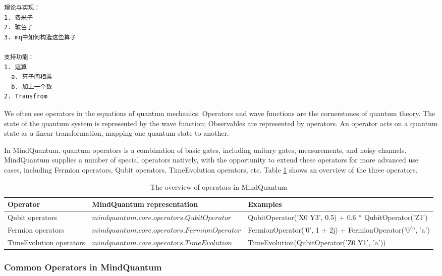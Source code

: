 \begin{lstlisting}
理论与实现：
1. 费米子
2. 玻色子
3. mq中如何构造这些算子

支持功能：
1. 运算
  a. 算子间相乘
  b. 加上一个数
2. Transfrom
\end{lstlisting}

We often see operators in the equations of quantum mechanics. Operators and wave functions are the cornerstones of quantum theory. The state of the quantum system is represented by the wave function; Observables are represented by operators. An operator acts on a quantum state as a linear transformation, mapping one quantum state to another.

In MindQuantum, quantum operators is a combination of basic gates, including unitary gates, measurements, and noisy channels. MindQuantum supplies a number of special operators natively, with the opportunity to extend these operators for more advanced use cases, including Fermion operators, Qubit operators, TimeEvolution operators, etc. Table \ref{operators_table} shows an overview of the three operators.

\begin{table}[htbp]
    \centering
    \caption{The overview of operators in MindQuantum}
    \label{operators_table}  %
    \begin{tabular}[htbp]{l|l|l}
        \textbf{Operator}       & \textbf{MindQuantum representation}          & \textbf{Examples}                                                   \\
        \hline
        Qubit operators         & $mindquantum.core.operators.QubitOperator$   & QubitOperator('X0 Y3', 0.5) + 0.6 * QubitOperator('Z1')             \\
        Fermion operators       & $mindquantum.core.operators.FermionOperator$ & FermionOperator('0', 1 + 2j) + FermionOperator('$0^{\wedge}$', 'a') \\
        TimeEvolution operators & $mindquantum.core.operators.TimeEvolution$   & TimeEvolution(QubitOperator('Z0 Y1', 'a'))                          \\
        \hline
    \end{tabular}
\end{table}


\subsubsection{Common Operators in MindQuantum}
